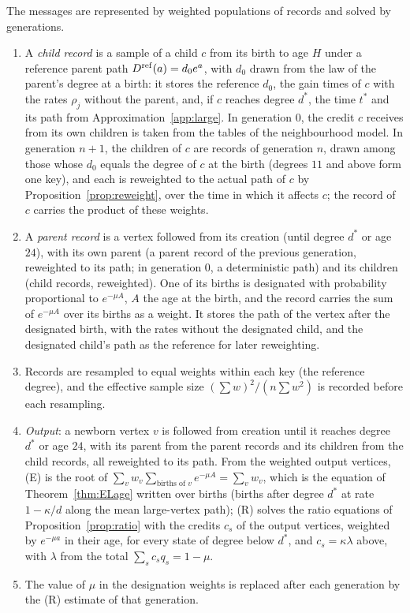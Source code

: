 \documentclass[11pt]{article}
\theoremstyle{plain}
\theoremstyle{definition}
\theoremstyle{remark}
\begin{document}
The messages are represented by weighted populations of records and solved by generations.
\begin{enumerate}
\item A \emph{child record} is a sample of a child $c$ from its birth to age $H$ under a reference parent path $D^{\rm ref}(a)=d_0e^a$, with $d_0$ drawn from the law of the parent's degree at a birth: it stores the reference $d_0$, the gain times of $c$ with the rates $\rho_j$ without the parent, and, if $c$ reaches degree $d^*$, the time $t^*$ and its path from Approximation~\ref{app:large}. In generation $0$, the credit $c$ receives from its own children is taken from the tables of the neighbourhood model. In generation $n+1$, the children of $c$ are records of generation $n$, drawn among those whose $d_0$ equals the degree of $c$ at the birth (degrees $11$ and above form one key), and each is reweighted to the actual path of $c$ by Proposition~\ref{prop:reweight}, over the time in which it affects $c$; the record of $c$ carries the product of these weights.
\item A \emph{parent record} is a vertex followed from its creation (until degree $d^*$ or age $24$), with its own parent (a parent record of the previous generation, reweighted to its path; in generation $0$, a deterministic path) and its children (child records, reweighted). One of its births is designated with probability proportional to $e^{-\mu A}$, $A$ the age at the birth, and the record carries the sum of $e^{-\mu A}$ over its births as a weight. It stores the path of the vertex after the designated birth, with the rates without the designated child, and the designated child's path as the reference for later reweighting.
\item Records are resampled to equal weights within each key (the reference degree), and the effective sample size $(\sum w)^2/(n\sum w^2)$ is recorded before each resampling.
\item \emph{Output}: a newborn vertex $v$ is followed from creation until it reaches degree $d^*$ or age $24$, with its parent from the parent records and its children from the child records, all reweighted to its path. From the weighted output vertices, (E) is the root of $\sum_vw_v\sum_{\text{births of }v}e^{-\mu A}=\sum_vw_v$, which is the equation of Theorem~\ref{thm:ELage} written over births (births after degree $d^*$ at rate $1-\kappa/d$ along the mean large-vertex path); (R) solves the ratio equations of Proposition~\ref{prop:ratio} with the credits $c_s$ of the output vertices, weighted by $e^{-\mu a}$ in their age, for every state of degree below $d^*$, and $c_s=\kappa\lambda$ above, with $\lambda$ from the total $\sum_sc_sq_s=1-\mu$.
\item The value of $\mu$ in the designation weights is replaced after each generation by the (R) estimate of that generation.
\end{enumerate}
\end{document}
